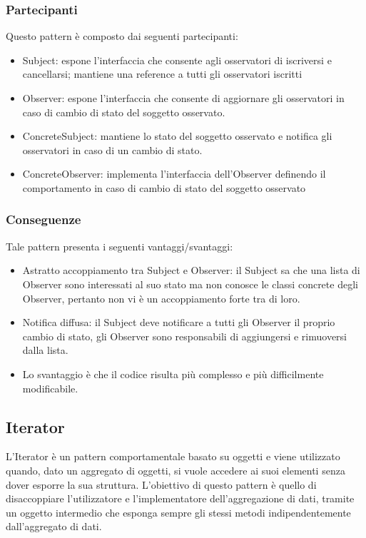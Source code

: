\documentclass{article}
\begin{document}
\subsubsection{Partecipanti}
Questo pattern è composto dai seguenti partecipanti:
\begin{itemize}
  \item Subject: espone l’interfaccia che consente agli osservatori di iscriversi e cancellarsi; mantiene una reference a tutti gli osservatori iscritti
  \item Observer: espone l’interfaccia che consente di aggiornare gli osservatori in caso di cambio di stato del soggetto osservato.
  \item ConcreteSubject: mantiene lo stato del soggetto osservato e notifica gli osservatori in caso di un cambio di stato.
  \item ConcreteObserver: implementa l’interfaccia dell’Observer definendo il comportamento in caso di cambio di stato del soggetto osservato
\end{itemize}
\subsubsection{Conseguenze}
Tale pattern presenta i seguenti vantaggi/svantaggi:
\begin{itemize}
  \item Astratto accoppiamento tra Subject e Observer: il Subject sa che una lista di Observer sono interessati al suo stato ma non conosce le classi concrete degli Observer, pertanto non vi è un accoppiamento forte tra di loro.
  \item Notifica diffusa: il Subject deve notificare a tutti gli Observer il proprio cambio di stato, gli Observer sono responsabili di aggiungersi e rimuoversi dalla lista.
  \item Lo svantaggio è che il codice risulta più complesso e più difficilmente modificabile.
\end{itemize}


\subsection{Iterator}
L'Iterator è un pattern comportamentale basato su oggetti e viene utilizzato quando, dato un aggregato di oggetti, si vuole accedere ai suoi elementi senza dover esporre la sua struttura. L’obiettivo di questo pattern è quello di disaccoppiare l’utilizzatore e l’implementatore dell’aggregazione di dati, tramite un oggetto intermedio che esponga sempre gli stessi metodi indipendentemente dall’aggregato di dati.
\end{document}
